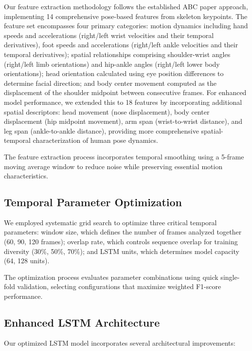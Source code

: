 \documentclass{iopconfser}
\begin{document}
Our feature extraction methodology follows the established ABC paper approach, implementing 14 comprehensive pose-based features from skeleton keypoints. The feature set encompasses four primary categories: motion dynamics including hand speeds and accelerations (right/left wrist velocities and their temporal derivatives), foot speeds and accelerations (right/left ankle velocities and their temporal derivatives); spatial relationships comprising shoulder-wrist angles (right/left limb orientations) and hip-ankle angles (right/left lower body orientations); head orientation calculated using eye position differences to determine facial direction; and body center movement computed as the displacement of the shoulder midpoint between consecutive frames. For enhanced model performance, we extended this to 18 features by incorporating additional spatial descriptors: head movement (nose displacement), body center displacement (hip midpoint movement), arm span (wrist-to-wrist distance), and leg span (ankle-to-ankle distance), providing more comprehensive spatial-temporal characterization of human pose dynamics.

The feature extraction process incorporates temporal smoothing using a 5-frame moving average window to reduce noise while preserving essential motion characteristics.

\subsection{Temporal Parameter Optimization}

We employed systematic grid search to optimize three critical temporal parameters: window size, which defines the number of frames analyzed together (60, 90, 120 frames); overlap rate, which controls sequence overlap for training diversity (30\%, 50\%, 70\%); and LSTM units, which determines model capacity (64, 128 units).

The optimization process evaluates parameter combinations using quick single-fold validation, selecting configurations that maximize weighted F1-score performance.

\subsection{Enhanced LSTM Architecture}

Our optimized LSTM model incorporates several architectural improvements:
\end{document}
